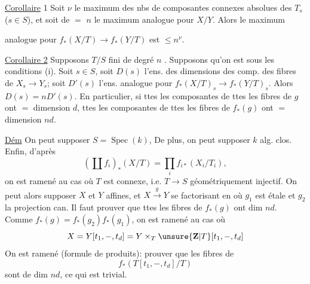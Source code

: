 \uline{Corollaire} 1 Soit $\nu$ le maximum des nbs  de composantes connexes absolues des $T_s$ ($s\in S$), et soit de $=$ $n$ le maximum analogue pour $X/Y$. Alors le maximum

analogue pour $f_*(X/T)\to f_*(Y/T)$ est $\leq n^\nu$.


\uline{Corollaire 2} Supposons $T/S$ fini de degré $n$ .
Supposons qu'on est sous les conditions (i).
Soit  $s\in S$, soit $D(s)$ l'ens. des dimensions des  comp. des fibres de $X_s\to Y_s$;  soit $D'(s)$ l'ens. analogue pour $f_*(X/T)_s\to f_*(Y/T)_s$. Alors $D(s)=nD'(s)$.
En particulier, si ttes les composantes de ttes les fibres de $g$ ont $=$ dimension $d$,  ttes les composantes de ttes les fibres de $f_*(g)$ ont $=$ dimension $nd$.

\uline{Dém} On peut supposer $S=\operatorname{Spec}(k)$, De plus, on peut supposer $k$ alg. clos. Enfin, d'après
\[
(\coprod f_i)_*(X/T)=\prod_i f_{i*}(X_i/T_i),
\]
on est ramené au cas où $T$ est connexe, i.e. $T\to S$ géométriquement injectif. On peut alors supposer $X$ et $Y$ affines, et $X\xrightarrow{g}Y$  se factorisant en
où $g_1$ est étale et $g_2$ la projection can.
  Il faut prouver que ttes les fibres de $f_*(g)$ ont dim $nd$.
Comme $f_*(g)=f_*(g_2)f_*(g_1)$,  on est ramené au cas où
\[
X=Y[t_1,-,t_d]=Y\times_T\unsure{\mathbf Z|T}[t_1,-,t_d]
\]
\deleted{\unsure{où} $\unsure{Z|2}=T[t$}
On est ramené (formule de produits): prouver que les fibres de
\[
f_*(T[t_1,-,t_d]/T)
\]
sont de dim $nd$, ce qui est trivial.

